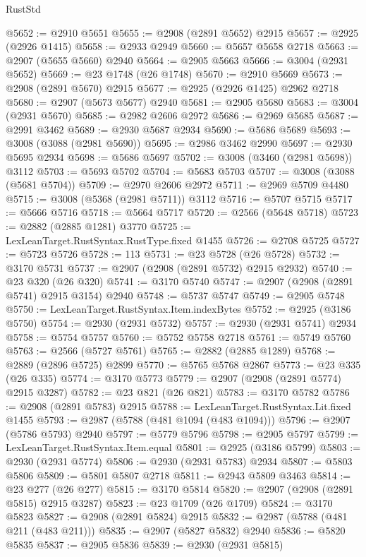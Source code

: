 \begin{lexlean}{RustStd}
\begin{coremodule}
@5652 := @2910 @5651
@5655 := @2908 (@2891 @5652) @2915
@5657 := @2925 (@2926 @1415)
@5658 := @2933 @2949
@5660 := @5657 @5658 @2718
@5663 := @2907 (@5655 @5660) @2940
@5664 := @2905 @5663
@5666 := @3004 (@2931 @5652)
@5669 := @23 @1748 (@26 @1748)
@5670 := @2910 @5669
@5673 := @2908 (@2891 @5670) @2915
@5677 := @2925 (@2926 @1425) @2962 @2718
@5680 := @2907 (@5673 @5677) @2940
@5681 := @2905 @5680
@5683 := @3004 (@2931 @5670)
@5685 := @2982 @2606 @2972
@5686 := @2969 @5685
@5687 := @2991 @3462
@5689 := @2930 @5687 @2934
@5690 := @5686 @5689
@5693 := @3008 (@3088 (@2981 @5690))
@5695 := @2986 @3462 @2990
@5697 := @2930 @5695 @2934
@5698 := @5686 @5697
@5702 := @3008 (@3460 (@2981 @5698)) @3112
@5703 := @5693 @5702
@5704 := @5683 @5703
@5707 := @3008 (@3088 (@5681 @5704))
@5709 := @2970 @2606 @2972
@5711 := @2969 @5709 @4480
@5715 := @3008 (@5368 (@2981 @5711)) @3112
@5716 := @5707 @5715
@5717 := @5666 @5716
@5718 := @5664 @5717
@5720 := @2566 (@5648 @5718)
@5723 := @2882 (@2885 @1281) @3770
@5725 := LexLeanTarget.RustSyntax.RustType.fixed @1455
@5726 := @2708 @5725
@5727 := @5723 @5726
@5728 := 113
@5731 := @23 @5728 (@26 @5728)
@5732 := @3170 @5731
@5737 := @2907 (@2908 (@2891 @5732) @2915 @2932)
@5740 := @23 @320 (@26 @320)
@5741 := @3170 @5740
@5747 := @2907 (@2908 (@2891 @5741) @2915 @3154) @2940
@5748 := @5737 @5747
@5749 := @2905 @5748
@5750 := LexLeanTarget.RustSyntax.Item.indexBytes
@5752 := @2925 (@3186 @5750)
@5754 := @2930 (@2931 @5732)
@5757 := @2930 (@2931 @5741) @2934
@5758 := @5754 @5757
@5760 := @5752 @5758 @2718
@5761 := @5749 @5760
@5763 := @2566 (@5727 @5761)
@5765 := @2882 (@2885 @1289)
@5768 := @2889 (@2896 @5725) @2899
@5770 := @5765 @5768 @2867
@5773 := @23 @335 (@26 @335)
@5774 := @3170 @5773
@5779 := @2907 (@2908 (@2891 @5774) @2915 @3287)
@5782 := @23 @821 (@26 @821)
@5783 := @3170 @5782
@5786 := @2908 (@2891 @5783) @2915
@5788 := LexLeanTarget.RustSyntax.Lit.fixed @1455
@5793 := @2987 (@5788 (@481 @1094 (@483 @1094)))
@5796 := @2907 (@5786 @5793) @2940
@5797 := @5779 @5796
@5798 := @2905 @5797
@5799 := LexLeanTarget.RustSyntax.Item.equal
@5801 := @2925 (@3186 @5799)
@5803 := @2930 (@2931 @5774)
@5806 := @2930 (@2931 @5783) @2934
@5807 := @5803 @5806
@5809 := @5801 @5807 @2718
@5811 := @2943 @5809 @3463
@5814 := @23 @277 (@26 @277)
@5815 := @3170 @5814
@5820 := @2907 (@2908 (@2891 @5815) @2915 @3287)
@5823 := @23 @1709 (@26 @1709)
@5824 := @3170 @5823
@5827 := @2908 (@2891 @5824) @2915
@5832 := @2987 (@5788 (@481 @211 (@483 @211)))
@5835 := @2907 (@5827 @5832) @2940
@5836 := @5820 @5835
@5837 := @2905 @5836
@5839 := @2930 (@2931 @5815)

\end{coremodule}
\end{lexlean}
